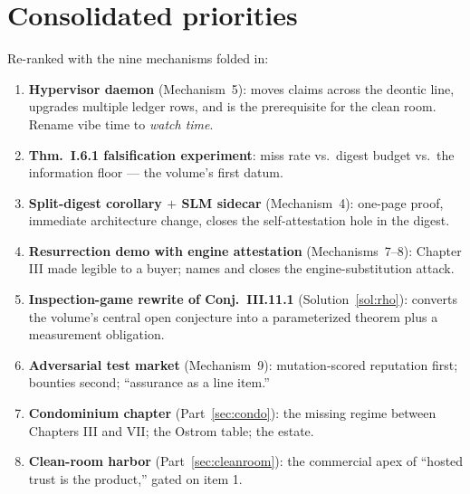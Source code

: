 \documentclass[11pt,a4paper]{article}
\theoremstyle{definition}
\theoremstyle{remark}
\begin{document}
\section{Consolidated priorities}\label{sec:priorities}
Re-ranked with the nine mechanisms folded in:
\begin{enumerate}[leftmargin=1.4em,itemsep=1pt]
\item \textbf{Hypervisor daemon} (Mechanism~5): moves claims across the deontic line, upgrades multiple ledger rows, and is the prerequisite for the clean room. Rename vibe time to \emph{watch time}.
\item \textbf{Thm.~I.6.1 falsification experiment}: miss rate vs.\ digest budget vs.\ the information floor --- the volume's first datum.
\item \textbf{Split-digest corollary $+$ SLM sidecar} (Mechanism~4): one-page proof, immediate architecture change, closes the self-attestation hole in the digest.
\item \textbf{Resurrection demo with engine attestation} (Mechanisms~7--8): Chapter III made legible to a buyer; names and closes the engine-substitution attack.
\item \textbf{Inspection-game rewrite of Conj.~III.11.1} (Solution~\ref{sol:rho}): converts the volume's central open conjecture into a parameterized theorem plus a measurement obligation.
\item \textbf{Adversarial test market} (Mechanism~9): mutation-scored reputation first; bounties second; ``assurance as a line item.''
\item \textbf{Condominium chapter} (Part~\ref{sec:condo}): the missing regime between Chapters III and VII; the Ostrom table; the estate.
\item \textbf{Clean-room harbor} (Part~\ref{sec:cleanroom}): the commercial apex of ``hosted trust is the product,'' gated on item 1.
\end{enumerate}
\end{document}

